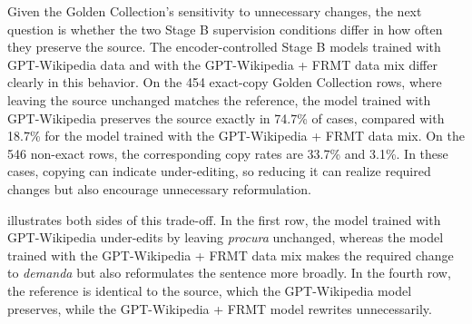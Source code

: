 Given the Golden Collection's sensitivity to unnecessary changes, the next
question is whether the two Stage B supervision conditions differ in how often
they preserve the source. The encoder-controlled Stage B models trained with
GPT-Wikipedia data and with the GPT-Wikipedia + FRMT data mix differ clearly in
this behavior. On the 454 exact-copy Golden Collection rows, where leaving the source
unchanged matches the reference, the model trained with GPT-Wikipedia preserves
the source exactly in 74.7\% of cases, compared with 18.7\% for the model trained
with the GPT-Wikipedia + FRMT data mix. On the 546 non-exact rows, the
corresponding copy rates are 33.7\% and 3.1\%. In these cases, copying can
indicate under-editing, so reducing it can realize required changes but also
encourage unnecessary reformulation.

 illustrates both sides of this
trade-off. In the first row, the model trained with GPT-Wikipedia under-edits by
leaving \textit{procura} unchanged, whereas the model trained with the
GPT-Wikipedia + FRMT data mix makes the required change to \textit{demanda} but
also reformulates the sentence more broadly. In the fourth row, the reference is
identical to the source, which the GPT-Wikipedia model preserves, while the
GPT-Wikipedia + FRMT model rewrites unnecessarily.

